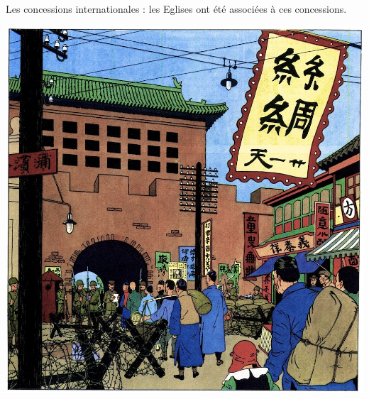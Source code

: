 \begin{marginfigure}
    \caption{Les concessions internationales : les Eglises ont été associées à ces concessions. }
    \includegraphics[width=\textwidth]{2023 - Dialogue Mission XX/Images/Sortie-de-l-enceinte Concession internationale.jpg}
\end{marginfigure}
